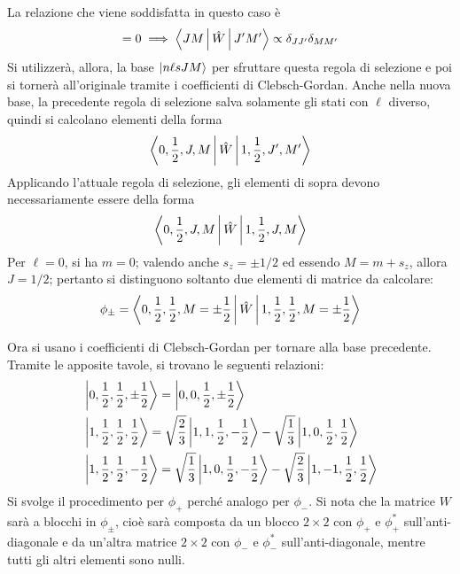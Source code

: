 \documentclass[11pt, a4paper]{scrartcl} %
\numberwithin{equation}{subsection}
\theoremstyle{style2}
\theoremstyle{style1}
\begin{document}
La relazione che viene soddisfatta in questo caso \`e 
\begin{equation}
	[\hat{J}_z, \hat{W}] =0 \implies \Braket{JM|\hat{W}|J'M'} \propto \delta _{JJ'} \delta _{MM'} 
\end{equation}
Si utilizzer\`a, allora, la base $\ket{n \ell s J M} $ per sfruttare questa regola di selezione e poi si torner\`a all'originale tramite i coefficienti di Clebsch-Gordan.
Anche nella nuova base, la precedente regola di selezione salva solamente gli stati con $\ell $ diverso, quindi si calcolano elementi della forma
\[
\Braket{0, \frac{1}{2}, J,M|\hat{W}|1 , \frac{1}{2}, J' ,M'} 
\] 
Applicando l'attuale regola di selezione, gli elementi di sopra devono necessariamente essere della forma
\[
\Braket{0, \frac{1}{2}, J,M|\hat{W}|1 , \frac{1}{2}, J ,M} 
\] 
Per $\ell =0$, si ha $m=0$; valendo anche $s_z = \pm 1 / 2$ ed essendo $M = m + s_z$, allora $J = 1 / 2$; pertanto si distinguono soltanto due elementi di matrice da calcolare:
\begin{equation}
	\phi _{\pm} = \Braket{0, \frac{1}{2}, \frac{1}{2}, M = \pm \frac{1}{2}|\hat{W}|1, \frac{1}{2}, \frac{1}{2}, M = \pm \frac{1}{2}} 
\end{equation}
\vspace{.5cm}

Ora si usano i coefficienti di Clebsch-Gordan per tornare alla base precedente.
Tramite le apposite tavole, si trovano le seguenti relazioni:
\[
\begin{split}
	&\Ket{0, \frac{1}{2}, \frac{1}{2}, \pm \frac{1}{2}} = \Ket{0 , 0 , \frac{1}{2}, \pm \frac{1}{2}} \\
	& \Ket{1 , \frac{1}{2} , \frac{1}{2}, \frac{1}{2}} = \sqrt{\frac{2}{3}} \Ket{1,1,\frac{1}{2}, -\frac{1}{2}} - \sqrt{\frac{1}{3}}  \Ket{1,0,\frac{1}{2},\frac{1}{2}} \\
	& \Ket{1 , \frac{1}{2}, \frac{1}{2},-\frac{1}{2}} = \sqrt{\frac{1}{3}} \Ket{1,0,\frac{1}{2},-\frac{1}{2}} - \sqrt{\frac{2}{3}} \Ket{1,-1,\frac{1}{2}, \frac{1}{2}} 
\end{split}
\] 
Si svolge il procedimento per $\phi _+$ perch\'e analogo per $\phi _-$.
Si nota che la matrice $W$ sar\`a a blocchi in $\phi _{\pm} $, cio\`e sar\`a composta da un blocco $2\times 2$ con $\phi _+$ e $\phi _+^*$ sull'anti-diagonale e da un'altra matrice $2\times 2$ con $\phi _-$ e $\phi _-^*$ sull'anti-diagonale, mentre tutti gli altri elementi sono nulli.
\end{document}
